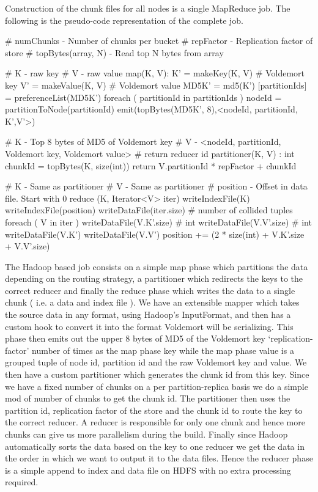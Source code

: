 \documentclass[10pt,twocolumn,preprint,natbib,authoryear]{sigplanconf}
\begin{document}
Construction of the chunk files for all nodes is a single MapReduce job. The following is the pseudo-code representation of the complete job. 

\scriptsize
\label{MapReduce for Chunk generation}
\begin{verbatimtab}
# numChunks - Number of chunks per bucket
# repFactor - Replication factor of store
# topBytes(array, N) - Read top N bytes from array

# K - raw key
# V - raw value
map(K, V):
  K' = makeKey(K, V)     # Voldemort key
  V' = makeValue(K, V)   # Voldemort value
  MD5K' = md5(K')
  [partitionIds] = preferenceList(MD5K')
  foreach ( partitionId in partitionIds )
    nodeId = partitionToNode(partitionId)
    emit(topBytes(MD5K', 8),<nodeId, partitionId, K',V'>)      

# K - Top 8 bytes of MD5 of Voldemort key
# V - <nodeId, partitionId, Voldemort key, Voldemort value>
# return reducer id
partitioner(K, V) : int
  chunkId = topBytes(K, size(int)) %
  return V.partitionId * repFactor + chunkId
 
# K - Same as partitioner
# V - Same as partitioner
# position - Offset in data file. Start with 0
reduce (K, Iterator<V> iter)
  writeIndexFile(K)
  writeIndexFile(position)
  writeDataFile(iter.size)   # number of collided tuples
  foreach ( V in iter )
    writeDataFile(V.K'.size) # int
    writeDataFile(V.V'.size) # int
    writeDataFile(V.K')
    writeDataFile(V.V')
    position += (2 * size(int) + V.K'.size + V.V'.size)
\end{verbatimtab}
\normalsize


The Hadoop based job consists on a simple map phase which partitions the data depending on the routing strategy, a partitioner which redirects the keys to the correct reducer and finally the reduce phase which writes the data to a single chunk ( i.e. a data and index file ). We have an extensible mapper which takes the source data in any format, using Hadoop's InputFormat, and then has a custom hook to convert it into the format Voldemort will be serializing. This phase then emits out the upper 8 bytes of MD5 of the Voldemort key `replication-factor' number of times as the map phase key while the map phase value is a grouped tuple of node id, partition id and the raw Voldemort key and value. We then have a custom partitioner which generates the chunk id from this key. Since we have a fixed number of chunks on a per partition-replica basis we do a simple mod of number of chunks to get the chunk id. The partitioner then uses the partition id, replication factor of the store and the chunk id to route the key to the correct reducer. A reducer is responsible for only one chunk and hence more chunks can give us more parallelism during the build. Finally since Hadoop automatically sorts the data based on the key to one reducer we get the data in the order in which we want to output it to the data files. Hence the reducer phase is a simple append to index and data file on HDFS with no extra processing required.  
\end{document}
